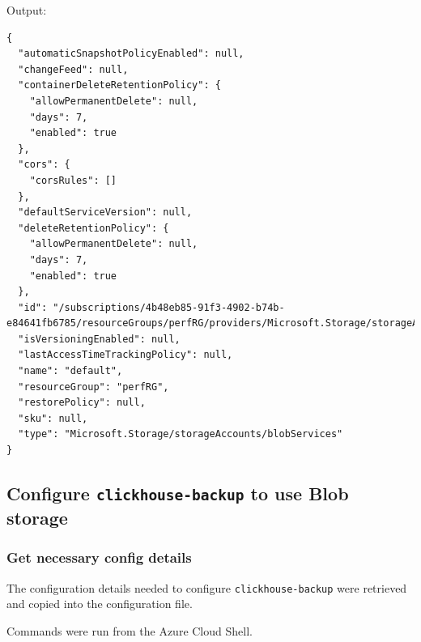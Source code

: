Output:
\begin{verbatim}
{
  "automaticSnapshotPolicyEnabled": null,
  "changeFeed": null,
  "containerDeleteRetentionPolicy": {
    "allowPermanentDelete": null,
    "days": 7,
    "enabled": true
  },
  "cors": {
    "corsRules": []
  },
  "defaultServiceVersion": null,
  "deleteRetentionPolicy": {
    "allowPermanentDelete": null,
    "days": 7,
    "enabled": true
  },
  "id": "/subscriptions/4b48eb85-91f3-4902-b74b-e84641fb6785/resourceGroups/perfRG/providers/Microsoft.Storage/storageAccounts/perfchbksa/blobServices/default",
  "isVersioningEnabled": null,
  "lastAccessTimeTrackingPolicy": null,
  "name": "default",
  "resourceGroup": "perfRG",
  "restorePolicy": null,
  "sku": null,
  "type": "Microsoft.Storage/storageAccounts/blobServices"
}
\end{verbatim}
\subsection{Configure \texttt{clickhouse-backup} to use Blob storage}
\label{sec:org05c9377}
\subsubsection{Get necessary config details}
\label{sec:org28a9875}
The configuration details needed to configure \texttt{clickhouse-backup} were retrieved
and copied into the configuration file.

Commands were run from the Azure Cloud Shell.

